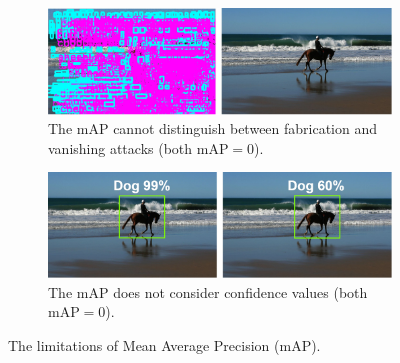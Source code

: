 \begin{figure}[btph]
    \centering
    \begin{subfigure}[b]{0.48\textwidth}
        \includegraphics[width=\linewidth]{figures/chapter_detection/fabrication.jpg}
        \caption{The mAP cannot distinguish between fabrication and vanishing attacks (both $\text{mAP} = 0$). %
        }
        \label{fig:fabrication} 
    \end{subfigure}
    \begin{subfigure}[b]{0.48\textwidth}
        \includegraphics[width=\linewidth]{figures/chapter_detection/mislabel.jpg}
        \caption{The mAP does not consider confidence values (both $\text{mAP} = 0$). 
        }
        \label{fig:mislabel}
    \end{subfigure}
  \caption{The limitations of Mean Average Precision (mAP).}
  \label{fig:map}
\end{figure}


